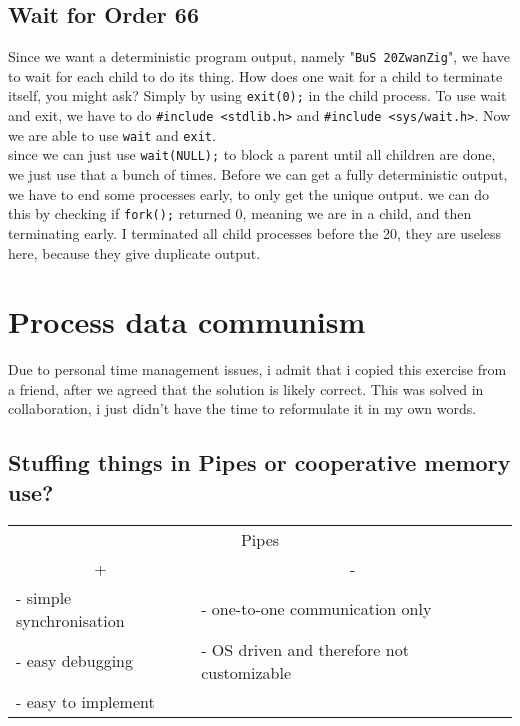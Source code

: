 \documentclass[a4paper, 11pt]{article}
\begin{document}
    \subsection{Wait for Order 66}
    Since we want a deterministic program output, namely "\texttt{BuS 20ZwanZig}", we have to wait for each child to do its thing.
    How does one wait for a child to terminate itself, you might ask? Simply by using \lstinline{exit(0);} in the child process. 
    To use wait and exit, we have to do \lstinline{#include <stdlib.h>} and \lstinline{#include <sys/wait.h>}.
    Now we are able to use \lstinline{wait} and \lstinline{exit}.\\
    since we can just use \lstinline{wait(NULL);} to block a parent until all children are done, we just use that a bunch of times.
    Before we can get a fully deterministic output, we have to end some processes early, to only get the unique output. we can do 
    this by checking if \lstinline{fork();} returned 0, meaning we are in a child, and then terminating early. I terminated all child
    processes before the 20, they are useless here, because they give duplicate output.  
    \newpage

    \section{Process data communism}
      Due to personal time management issues, i admit that i copied this exercise from a friend, after we agreed that the solution is likely correct.
      This was solved in collaboration, i just didn't have the time to reformulate it in my own words.
      \subsection{Stuffing things in Pipes or cooperative memory use?}
      \begin{table}[h]
            \begin{tabular}{@{}llll@{}}
                  \multicolumn{4}{c}{Pipes}                                                                                      \\
                  \multicolumn{2}{c}{+}                         & \multicolumn{2}{c}{-}                                          \\ \midrule
                  \multicolumn{2}{l|}{- simple synchronisation} & \multicolumn{2}{l}{- one-to-one communication only}            \\
                  \multicolumn{2}{l|}{- easy debugging}         & \multicolumn{2}{l}{- OS driven and therefore not customizable} \\
                  \multicolumn{2}{l|}{- easy to implement}      & \multicolumn{2}{l}{}                                          
            \end{tabular}
      \end{table}
\end{document}
